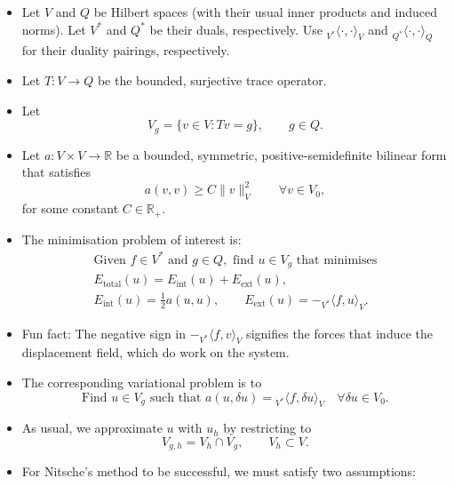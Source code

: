 \documentclass[11pt,a4paper]{article}
\begin{document}
\begin{itemize}
    \item Let $V$ and $Q$ be Hilbert spaces (with their usual inner products and induced norms). Let $V^*$ and $Q^*$ be their duals, respectively. Use ${}_{V^*}\langle\cdot,\cdot\rangle_V$ and ${}_{Q^*}\langle\cdot,\cdot\rangle_Q$ for their duality pairings, respectively.

    \item Let $T:V\to Q$ be the bounded, surjective trace operator.

    \item Let
    \[
        V_g=\{v\in V:T v=g\},\qquad g\in Q.
    \]

    \item Let $a:V\times V\to\mathbb R$ be a bounded, symmetric, positive-semidefinite bilinear form that satisfies
    \[
        a(v,v)\ge C\|v\|_V^2\qquad\forall v\in V_0,
    \]
    for some constant $C\in\mathbb R_+$.

    \item The minimisation problem of interest is:
    \[
        \boxed{\begin{gathered}
            \text{Given }f\in V^*\text{ and }g\in Q,\text{ find }u\in V_g
            \text{ that minimises}\\
            E_{\mathrm{total}}(u)=E_{\mathrm{int}}(u)+E_{\mathrm{ext}}(u),\\
            E_{\mathrm{int}}(u)=\frac12 a(u,u),\qquad
            E_{\mathrm{ext}}(u)=-{}_{V^*}\langle f,u\rangle_V.
        \end{gathered}}
    \]

    \item Fun fact: The negative sign in $-{}_{V^*}\langle f,v\rangle_V$ signifies the forces that induce the displacement field, which do work on the system.

    \item The corresponding variational problem is to
    \[
        \boxed{\text{Find }u\in V_g\text{ such that }
        a(u,\delta u)={}_{V^*}\langle f,\delta u\rangle_V
        \quad\forall\delta u\in V_0.}
    \]

    \item As usual, we approximate $u$ with $u_h$ by restricting to
    \[
        V_{g,h}=V_h\cap V_g,\qquad V_h\subset V.
    \]

    \item For Nitsche's method to be successful, we must satisfy two assumptions:
\end{itemize}
\end{document}
